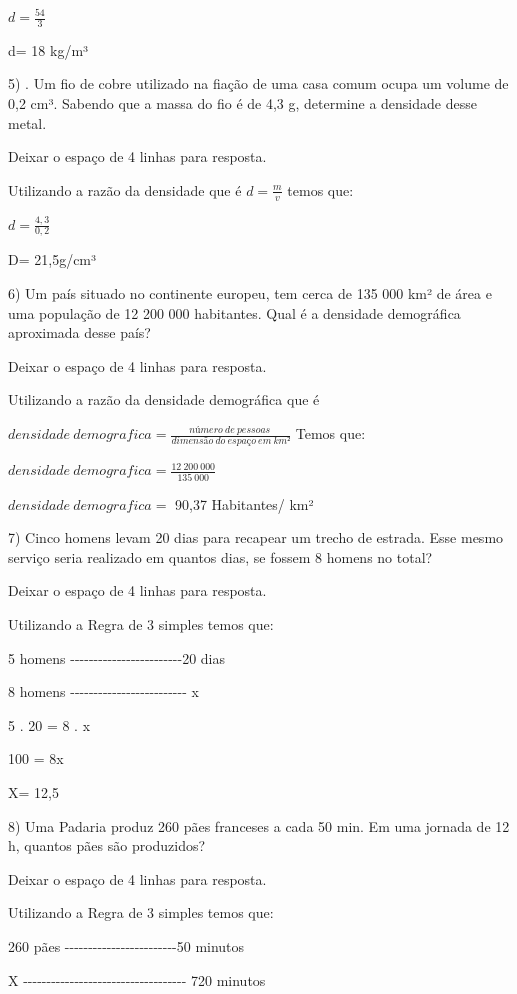 {\(d = \frac{54}{3}\)

d= 18 kg/m³

5) . Um fio de cobre utilizado na fiação de uma casa comum ocupa um
volume de 0,2 cm³. Sabendo que a massa do fio é de 4,3 g, determine a
densidade desse metal.

Deixar o espaço de 4 linhas para resposta.

Utilizando a razão da densidade que é \(d = \frac{m}{v}\) temos que:

\(d = \frac{4,3}{0,2}\)

D= 21,5g/cm³

6) Um país situado no continente europeu, tem cerca de 135 000 km² de
área e uma população de 12 200 000 habitantes. Qual é a densidade
demográfica aproximada desse país?

Deixar o espaço de 4 linhas para resposta.

Utilizando a razão da densidade demográfica que é

\(densidade\ demografica = \frac{número\ de\ pessoas\ }{dimensão\ do\ espaço\ em\ km²}\)
Temos que:

\(densidade\ demografica = \frac{12\ 200\ 000}{135\ 000}\)

\(densidade\ demografica =\) 90,37 Habitantes/ km²

7) Cinco homens levam 20 dias para recapear um trecho de estrada. Esse
mesmo serviço seria realizado em quantos dias, se fossem 8 homens no
total?

Deixar o espaço de 4 linhas para resposta.

Utilizando a Regra de 3 simples temos que:

5 homens
-\/-\/-\/-\/-\/-\/-\/-\/-\/-\/-\/-\/-\/-\/-\/-\/-\/-\/-\/-\/-\/-\/-\/-20
dias

8 homens
-\/-\/-\/-\/-\/-\/-\/-\/-\/-\/-\/-\/-\/-\/-\/-\/-\/-\/-\/-\/-\/-\/-\/-\/-
x

5 . 20 = 8 . x

100 = 8x

X= 12,5

8) Uma Padaria produz 260 pães franceses a cada 50 min. Em uma jornada
de 12 h, quantos pães são produzidos?

Deixar o espaço de 4 linhas para resposta.

Utilizando a Regra de 3 simples temos que:

260 pães
-\/-\/-\/-\/-\/-\/-\/-\/-\/-\/-\/-\/-\/-\/-\/-\/-\/-\/-\/-\/-\/-\/-\/-50
minutos

X
-\/-\/-\/-\/-\/-\/-\/-\/-\/-\/-\/-\/-\/-\/-\/-\/-\/-\/-\/-\/-\/-\/-\/-\/-\/-\/-\/-\/-\/-\/-\/-\/-\/-\/-
720 minutos

}
